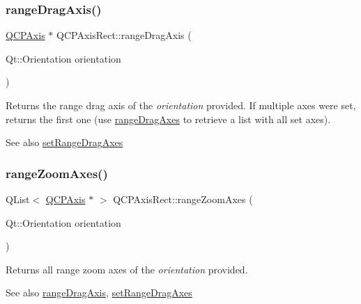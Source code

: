 \subsubsection{\texorpdfstring{range\+Drag\+Axis()}{rangeDragAxis()}}
{\footnotesize\ttfamily \mbox{\hyperlink{class_q_c_p_axis}{Q\+C\+P\+Axis}} $\ast$ Q\+C\+P\+Axis\+Rect\+::range\+Drag\+Axis (\begin{DoxyParamCaption}\item[{Qt\+::\+Orientation}]{orientation }\end{DoxyParamCaption})}

Returns the range drag axis of the {\itshape orientation} provided. If multiple axes were set, returns the first one (use \mbox{\hyperlink{class_q_c_p_axis_rect_aae5f99a044ca911685a306f01b7ff941}{range\+Drag\+Axes}} to retrieve a list with all set axes).

\begin{DoxySeeAlso}{See also}
\mbox{\hyperlink{class_q_c_p_axis_rect_a648cce336bd99daac4a5ca3e5743775d}{set\+Range\+Drag\+Axes}} 
\end{DoxySeeAlso}
\mbox{\label{class_q_c_p_axis_rect_a86aac0f435f209d60dacd22cda10c104}} 
\subsubsection{\texorpdfstring{range\+Zoom\+Axes()}{rangeZoomAxes()}}
{\footnotesize\ttfamily Q\+List$<$ \mbox{\hyperlink{class_q_c_p_axis}{Q\+C\+P\+Axis}} $\ast$ $>$ Q\+C\+P\+Axis\+Rect\+::range\+Zoom\+Axes (\begin{DoxyParamCaption}\item[{Qt\+::\+Orientation}]{orientation }\end{DoxyParamCaption})}

Returns all range zoom axes of the {\itshape orientation} provided.

\begin{DoxySeeAlso}{See also}
\mbox{\hyperlink{class_q_c_p_axis_rect_a6d7c22cfc54fac7a3d6ef80b133a8574}{range\+Drag\+Axis}}, \mbox{\hyperlink{class_q_c_p_axis_rect_a648cce336bd99daac4a5ca3e5743775d}{set\+Range\+Drag\+Axes}} 
\end{DoxySeeAlso}
\mbox{\label{class_q_c_p_axis_rect_a679c63f2b8daccfe6ec5110dce3dd3b6}} 
